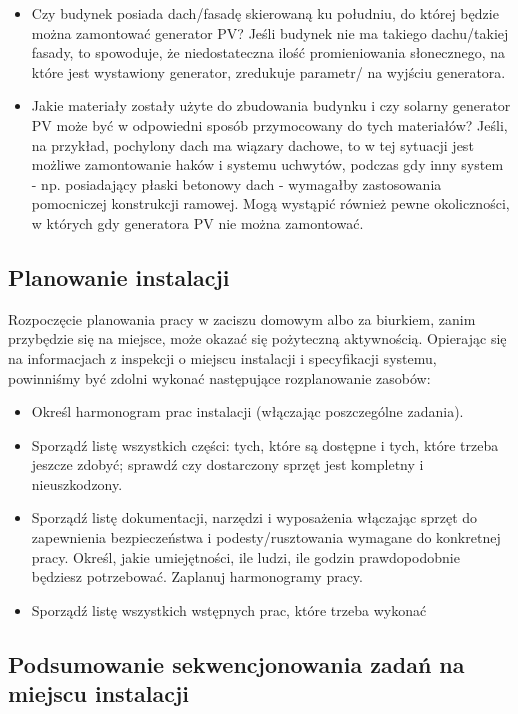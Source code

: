 \documentclass[12pt,a4paper]{article}
\begin{document}
\begin{itemize}
\item Czy budynek posiada dach/fasadę skierowaną ku południu, do której 
będzie można zamontować generator PV? Jeśli budynek nie ma takiego 
dachu/takiej fasady, to spowoduje, że niedostateczna ilość 
promieniowania słonecznego, na które jest wystawiony generator, 
zredukuje parametr/ na wyjściu generatora. 
\item Jakie materiały zostały użyte do zbudowania budynku i czy solarny 
generator PV może być w odpowiedni sposób przymocowany do tych 
materiałów? Jeśli, na przykład, pochylony dach ma wiązary dachowe, to w 
tej sytuacji jest możliwe zamontowanie haków i systemu uchwytów, podczas 
gdy inny system - np. posiadający płaski betonowy dach - wymagałby 
zastosowania pomocniczej konstrukcji ramowej. Mogą wystąpić również 
pewne okoliczności, w których gdy generatora PV nie można zamontować.
\end{itemize}
 

\subsection{Planowanie instalacji }


Rozpoczęcie planowania pracy w zaciszu domowym albo za biurkiem, zanim 
przybędzie się na miejsce, może okazać się pożyteczną aktywnością. 
Opierając się na informacjach z inspekcji o miejscu instalacji i 
specyfikacji systemu, powinniśmy być zdolni wykonać następujące 
rozplanowanie zasobów: 

\begin{itemize}
\item Określ harmonogram prac instalacji (włączając poszczególne 
zadania). 
\item Sporządź listę wszystkich części: tych, które są dostępne i tych, 
które trzeba jeszcze zdobyć; sprawdź czy dostarczony sprzęt jest 
kompletny i nieuszkodzony. 
\item Sporządź listę dokumentacji, narzędzi i wyposażenia włączając 
sprzęt do zapewnienia bezpieczeństwa i podesty/rusztowania wymagane do 
konkretnej pracy. Określ, jakie umiejętności, ile ludzi, ile godzin 
prawdopodobnie będziesz potrzebować. Zaplanuj harmonogramy pracy. 
\item Sporządź listę wszystkich wstępnych prac, które trzeba wykonać 
\end{itemize}
 

\subsection{Podsumowanie sekwencjonowania zadań na miejscu instalacji }
\end{document}
